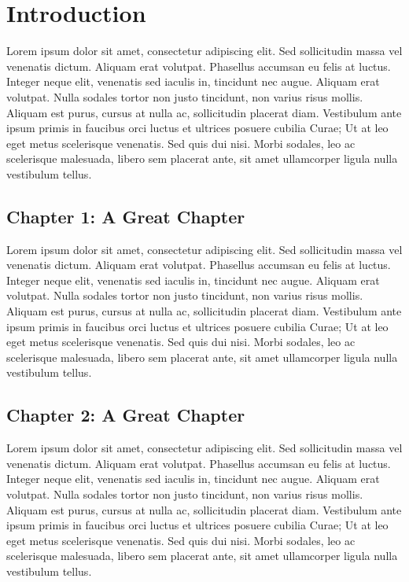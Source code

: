 \chapter*{Introduction}

\raggedbottom

\onehalfspacing
\setcounter{footnote}{0}
\renewcommand{\thefootnote}{\arabic{footnote}}

Lorem ipsum dolor sit amet, consectetur adipiscing elit. Sed sollicitudin massa vel venenatis dictum. Aliquam erat volutpat. Phasellus accumsan eu felis at luctus. Integer neque elit,  venenatis sed iaculis in, tincidunt nec augue. Aliquam erat volutpat. Nulla sodales tortor non justo tincidunt, non varius risus mollis. Aliquam est purus, cursus at nulla ac, sollicitudin placerat diam. Vestibulum ante ipsum primis in faucibus orci luctus et ultrices posuere cubilia Curae; Ut 
at leo eget metus scelerisque venenatis. Sed quis dui nisi. Morbi sodales, leo ac scelerisque malesuada, libero sem placerat ante,  sit amet ullamcorper ligula nulla vestibulum tellus.


\section*{Chapter 1: A Great Chapter}

Lorem ipsum dolor sit amet, consectetur adipiscing elit. Sed sollicitudin massa vel venenatis dictum. Aliquam erat volutpat. Phasellus accumsan eu felis at luctus. Integer neque elit,  venenatis sed iaculis in, tincidunt nec augue. Aliquam erat volutpat. Nulla sodales tortor non justo tincidunt, non varius risus mollis. Aliquam est purus, cursus at nulla ac, sollicitudin placerat diam. Vestibulum ante ipsum primis in faucibus orci luctus et ultrices posuere cubilia Curae; Ut 
at leo eget metus scelerisque venenatis. Sed quis dui nisi. Morbi sodales, leo ac scelerisque malesuada, libero sem placerat ante,  sit amet ullamcorper ligula nulla vestibulum tellus.

\section*{Chapter 2: A Great Chapter}

Lorem ipsum dolor sit amet, consectetur adipiscing elit. Sed sollicitudin massa vel venenatis dictum. Aliquam erat volutpat. Phasellus accumsan eu felis at luctus. Integer neque elit,  venenatis sed iaculis in, tincidunt nec augue. Aliquam erat volutpat. Nulla sodales tortor non justo tincidunt, non varius risus mollis. Aliquam est purus, cursus at nulla ac, sollicitudin placerat diam. Vestibulum ante ipsum primis in faucibus orci luctus et ultrices posuere cubilia Curae; Ut 
at leo eget metus scelerisque venenatis. Sed quis dui nisi. Morbi sodales, leo ac scelerisque malesuada, libero sem placerat ante,  sit amet ullamcorper ligula nulla vestibulum tellus.

